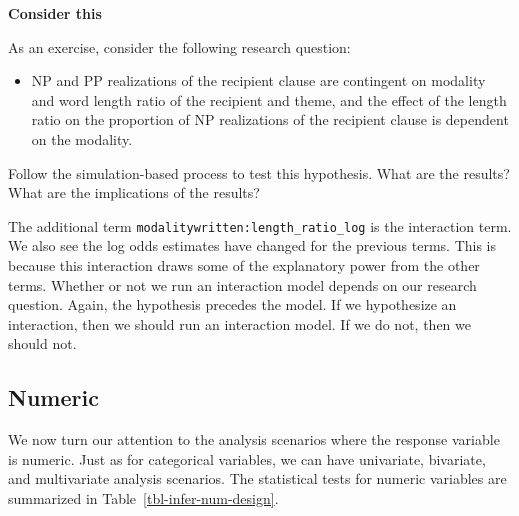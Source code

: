 \documentclass[
  letterpaper,
  krantz1]{latex/krantz-mod}
\providecommand{\tightlist}{%
  \setlength{\itemsep}{0pt}\setlength{\parskip}{0pt}}\usepackage{longtable,booktabs,array}
\theoremstyle{definition}
\theoremstyle{definition}
\theoremstyle{remark}
\begin{document}
\begin{tcolorbox}[enhanced jigsaw, toprule=.15mm, breakable, colback=white, arc=.35mm, left=2mm, colframe=quarto-callout-color-frame, opacityback=0, bottomrule=.15mm, rightrule=.15mm, leftrule=.75mm]

\textbf{ Consider this}

As an exercise, consider the following research question:

\begin{itemize}
\tightlist
\item
  NP and PP realizations of the recipient clause are contingent on
  modality and word length ratio of the recipient and theme, and the
  effect of the length ratio on the proportion of NP realizations of the
  recipient clause is dependent on the modality.
\end{itemize}

Follow the simulation-based process to test this hypothesis. What are
the results? What are the implications of the results?

\end{tcolorbox}

The additional term \texttt{modalitywritten:length\_ratio\_log} is the
interaction term. We also see the log odds estimates have changed for
the previous terms. This is because this interaction draws some of the
explanatory power from the other terms. Whether or not we run an
interaction model depends on our research question. Again, the
hypothesis precedes the model. If we hypothesize an interaction, then we
should run an interaction model. If we do not, then we should not.

\subsection{Numeric}\label{sec-infer-numeric}

We now turn our attention to the analysis scenarios where the response
variable is numeric. Just as for categorical
variables, we can have univariate, bivariate, and multivariate analysis
scenarios. The statistical tests for numeric variables are summarized in
Table~\ref{tbl-infer-num-design}.
\end{document}
